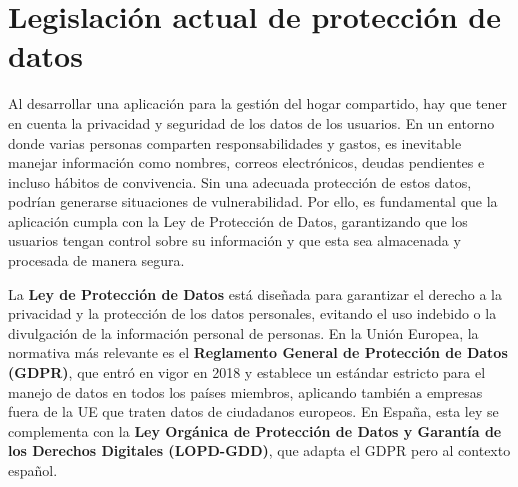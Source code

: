 \section{Legislación actual de protección de datos}

Al desarrollar una aplicación para la gestión del hogar compartido, hay que tener en cuenta la privacidad y seguridad de los datos de los usuarios.
En un entorno donde varias personas comparten responsabilidades y gastos, es inevitable manejar información como nombres, correos electrónicos, deudas pendientes e incluso hábitos de convivencia.
Sin una adecuada protección de estos datos, podrían generarse situaciones de vulnerabilidad. Por ello, es fundamental que la aplicación cumpla con la Ley de Protección de Datos, garantizando 
que los usuarios tengan control sobre su información y que esta sea almacenada y procesada de manera segura. 

La \textbf{Ley de Protección de Datos} está diseñada para garantizar el derecho a la privacidad y 
la protección de los datos personales, evitando el uso indebido o la divulgación de la información 
personal de personas. En la Unión Europea, la normativa más relevante es el 
\textbf{Reglamento General de Protección de Datos (GDPR)}, que entró en vigor en 2018 y 
establece un estándar estricto para el manejo de datos en todos los países miembros, aplicando también 
a empresas fuera de la UE que traten datos de ciudadanos europeos. En España, esta ley se complementa con 
la \textbf{Ley Orgánica de Protección de Datos y Garantía de los Derechos Digitales (LOPD-GDD)}, que adapta
el GDPR pero al contexto español. \cite{gdpr2016}

